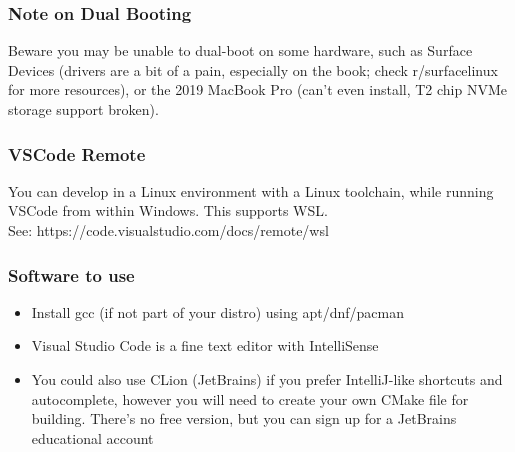 \documentclass{beamer}
\begin{document}
\begin{frame}
  \frametitle{Note on Dual Booting}
    Beware you may be unable to dual-boot on some hardware, such as Surface Devices (drivers are a bit of a pain, especially on the book; check r/surfacelinux for more resources), or the 2019 MacBook Pro (can't even install, T2 chip NVMe storage support broken).
\end{frame}
\begin{frame}
  \frametitle{VSCode Remote}
  You can develop in a Linux environment with a Linux toolchain, while running VSCode from within Windows. This supports WSL.\\
  See: https://code.visualstudio.com/docs/remote/wsl
\end{frame}
\begin{frame}
  \frametitle{Software to use}
  \begin{itemize}
    \item Install gcc (if not part of your distro) using apt/dnf/pacman
    \item Visual Studio Code is a fine text editor with IntelliSense
    \item You could also use CLion (JetBrains) if you prefer IntelliJ-like shortcuts and autocomplete, however you will need to create your own CMake file for building. There's no free version, but you can sign up for a JetBrains educational account
  \end{itemize}
\end{frame}
\end{document}
